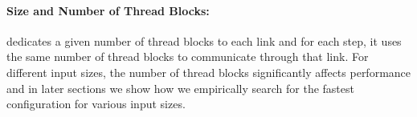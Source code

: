\paragraph{Size and Number of Thread Blocks:} \tool{} dedicates a
given number of thread blocks to each link and for each step, it uses
the same number of thread blocks to communicate through that link. For
different input sizes, the number of thread blocks significantly
affects performance and in later sections we show how we empirically
search for the fastest configuration for various input sizes.




